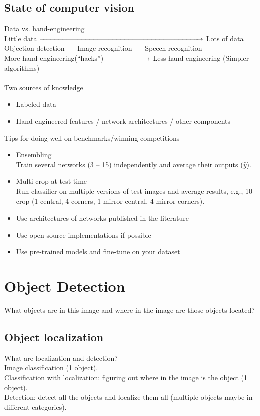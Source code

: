 %
\subsection{State of computer vision}
Data vs. hand-engineering\\
Little data $\xrightarrow{\hspace*{8cm}}$ Lots of data\\
Objection detection \ \ \  Image recognition \ \ \ Speech recognition\\
More hand-engineering(``hacks'') $\xrightarrow{\hspace*{2cm}}$ Less hand-engineering (Simpler algorithms)\\
\\
Two sources of knowledge
\begin{itemize}
\item
Labeled data
\item
Hand engineered features / network architectures / other components
\end{itemize}

Tips for doing well on benchmarks/winning competitions
\begin{itemize}
\item
Ensembling\\
Train several networks (3 -- 15) independently and average their outputs ($\hat{y}$).
\item
Multi-crop at test time\\
Run classifier on multiple versions of test images and average results, e.g., 10--crop (1 central, 4 corners, 1 mirror central, 4 mirror corners).
\item
Use architectures of networks published in the literature
\item
Use open source implementations if possible
\item
Use pre-trained models and fine-tune on your dataset
\end{itemize}


\section{Object Detection}
What objects are in this image and where in the image are those objects located?
%
\subsection{Object localization}
What are localization and detection?\\
Image classification (1 object).\\
Classification with localization: figuring out where in the image is the object (1 object).\\
Detection: detect all the objects and localize them all (multiple objects maybe in different categories).

